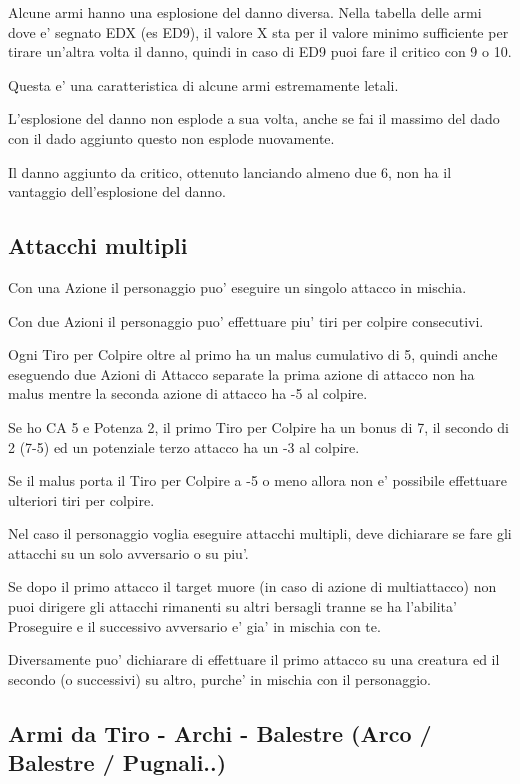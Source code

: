 \documentclass[a4paper,11pt,twoside,openany]{dndbook}
\begin{document}
Alcune armi hanno una esplosione del danno diversa. Nella tabella delle armi dove e' segnato EDX (es ED9), il valore X sta per il valore minimo sufficiente per tirare un'altra volta il danno, quindi in caso di ED9 puoi fare il critico con 9 o 10.

Questa e' una caratteristica di alcune armi estremamente letali.

L'esplosione del danno non esplode a sua volta, anche se fai il massimo del dado con il dado aggiunto questo non esplode nuovamente.

Il danno aggiunto da critico, ottenuto lanciando almeno due 6, non ha il vantaggio dell'esplosione del danno.

\subsection{Attacchi multipli}

Con una Azione il personaggio puo' eseguire un singolo attacco in mischia.

Con due Azioni il personaggio puo' effettuare piu' tiri per colpire consecutivi.

Ogni Tiro per Colpire oltre al primo ha un malus cumulativo di 5, quindi anche eseguendo due Azioni di Attacco separate la prima azione di attacco non ha malus mentre la seconda azione di attacco ha -5 al colpire.

Se ho CA 5 e Potenza 2, il primo Tiro per Colpire ha un bonus di 7, il secondo di 2 (7-5) ed un potenziale terzo attacco ha un -3 al colpire.

Se il malus porta il Tiro per Colpire a -5 o meno allora non e' possibile effettuare ulteriori tiri per colpire.

Nel caso il personaggio voglia eseguire attacchi multipli, deve dichiarare se fare gli attacchi su un solo avversario o su piu'.

Se dopo il primo attacco il target muore (in caso di azione di multiattacco) non puoi dirigere gli attacchi rimanenti su altri bersagli tranne se ha l'abilita' Proseguire e il successivo avversario e' gia' in mischia con te.

Diversamente puo' dichiarare di effettuare il primo attacco su una creatura ed il secondo (o successivi) su altro, purche' in mischia con il personaggio.

\subsection{Armi da Tiro - Archi - Balestre (Arco / Balestre / Pugnali..)}
\end{document}
